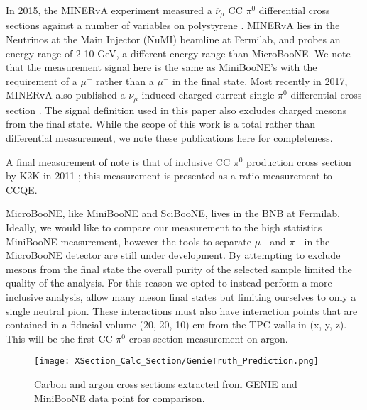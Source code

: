 \documentclass{article}
\begin{document}
\par In 2015, the MINERvA experiment measured a $\overline{\nu}_\mu$ CC $\pi^0$ differential cross sections against a number of variables on polystyrene \cite{bib:minerva_thesis} \cite{bib:minerva_paper}.  MINERvA lies in the Neutrinos at the Main Injector (NuMI) beamline at Fermilab, and probes an energy range of 2-10 GeV, a different energy range than MicroBooNE.  We note that the measurement signal here is the same as MiniBooNE's with the requirement of a $\mu^+$ rather than a $\mu^-$ in the final state. Most recently in 2017, MINERvA also published a $\nu_\mu$-induced charged current single $\pi^0$ differential cross section \cite{bib:minerva_paper_2017}.  The signal definition used in this paper also excludes charged mesons from the final state. While the scope of this work is a total rather than differential measurement, we note these publications here for completeness. 
\par A final measurement of note is that of inclusive CC $\pi^0$ production cross section by K2K in 2011 \cite{bib:k2k_paper}; this measurement is presented as a ratio measurement to CCQE.  
\par MicroBooNE, like MiniBooNE and SciBooNE, lives in the BNB at Fermilab. Ideally, we would like to compare our measurement to the high statistics MiniBooNE measurement, however the tools to separate $\mu^-$ and $\pi^-$ in the MicroBooNE detector are still under development. By attempting to exclude mesons from the final state the overall purity of the selected sample limited the quality of the analysis. For this reason we opted to instead perform a more inclusive analysis, allow many meson final states but limiting ourselves to only a single neutral pion. These interactions must also have interaction points that are contained in a fiducial volume (20, 20, 10) cm from the TPC walls in (x, y, z). This will be the first CC $\pi^0$ cross section measurement on argon.

\begin{figure}[h!]
\centering
\texttt{[image: XSection\_Calc\_Section/GenieTruth\_Prediction.png]}
\caption{ Carbon and argon cross sections extracted from GENIE and MiniBooNE data point for comparison. }
\label{fig:genie_extracted_xsec}
\end{figure}
\end{document}
